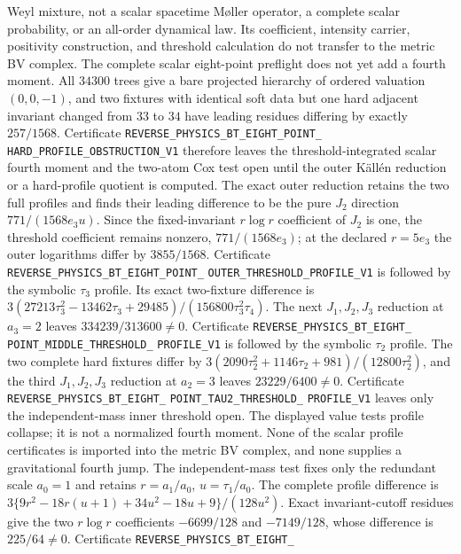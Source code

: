 \documentclass[11pt]{article}
\theoremstyle{definition}
\theoremstyle{remark}
\begin{document}
Weyl mixture, not a scalar spacetime M\o ller operator, a complete scalar
probability, or an all-order dynamical law.  Its coefficient, intensity
carrier, positivity construction, and threshold calculation do not transfer
to the metric BV complex.  The complete scalar eight-point preflight does not
yet add a fourth moment.  All $34300$ trees give a bare projected hierarchy
of ordered valuation $(0,0,-1)$, and two fixtures with identical soft data
but one hard adjacent invariant changed from $33$ to $34$ have leading
residues differing by exactly $257/1568$.  Certificate
\texttt{REVERSE\_PHYSICS\_BT\_EIGHT\_POINT\_}
\allowbreak\texttt{HARD\_PROFILE\_OBSTRUCTION\_V1}
therefore leaves the threshold-integrated scalar fourth moment and the
two-atom Cox test open until the outer K\"all\'en reduction or a hard-profile
quotient is computed.  The exact outer reduction retains the two full
profiles and finds their leading difference to be the pure $J_2$ direction
$771/(1568e_3u)$.  Since the fixed-invariant $r\log r$ coefficient of $J_2$
is one, the threshold coefficient remains nonzero, $771/(1568e_3)$; at the
declared $r=5e_3$ the outer logarithms differ by $3855/1568$.  Certificate
\texttt{REVERSE\_PHYSICS\_BT\_EIGHT\_POINT\_}
\allowbreak\texttt{OUTER\_THRESHOLD\_PROFILE\_V1}
is followed by the symbolic $\tau_3$ profile.  Its exact two-fixture
difference is
$3(27213\tau_3^2-13462\tau_3+29485)/(156800\tau_3^2\tau_4)$.
The next $J_1,J_2,J_3$ reduction at $a_3=2$ leaves
$334239/313600\ne0$.  Certificate
\texttt{REVERSE\_PHYSICS\_BT\_EIGHT\_}\allowbreak
\texttt{POINT\_MIDDLE\_THRESHOLD\_}\allowbreak
\texttt{PROFILE\_V1}
is followed by the symbolic $\tau_2$ profile.  The two complete hard fixtures
differ by
$3(2090\tau_2^2+1146\tau_2+981)/(12800\tau_2^2)$, and the third
$J_1,J_2,J_3$ reduction at $a_2=3$ leaves $23229/6400\ne0$.
Certificate
\texttt{REVERSE\_PHYSICS\_BT\_EIGHT\_}\allowbreak
\texttt{POINT\_TAU2\_THRESHOLD\_}\allowbreak
\texttt{PROFILE\_V1}
leaves only the independent-mass inner threshold open.  The displayed value
tests profile collapse; it is not a normalized fourth moment.  None of the
scalar profile certificates is imported into the metric BV complex, and none
supplies a gravitational fourth jump.
The independent-mass test fixes only the redundant scale $a_0=1$ and retains
$r=a_1/a_0$, $u=\tau_1/a_0$.  The complete profile difference is
$3\{9r^2-18r(u+1)+34u^2-18u+9\}/(128u^2)$.  Exact invariant-cutoff residues
give the two $r\log r$ coefficients $-6699/128$ and $-7149/128$, whose
difference is $225/64\ne0$.  Certificate
\texttt{REVERSE\_PHYSICS\_BT\_EIGHT\_}\allowbreak
\end{document}
